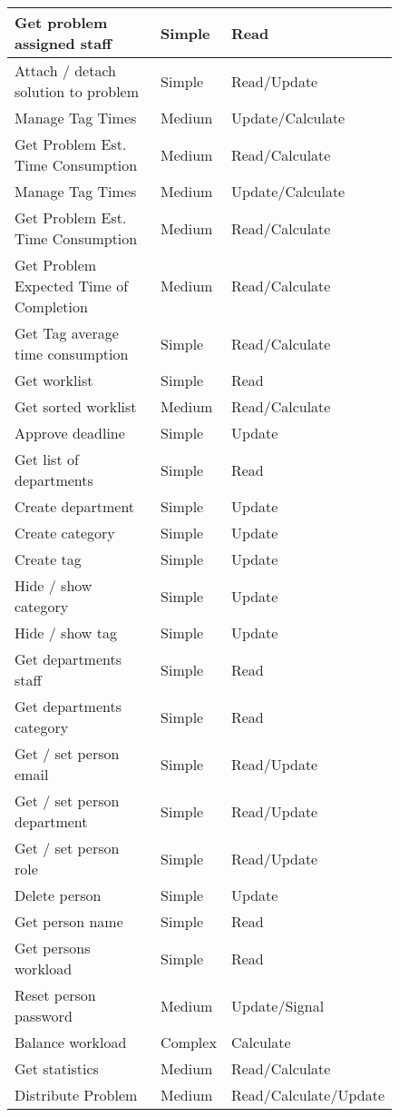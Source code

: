 \begin{figure}[hpt]
\begin{center}
\begin{tabular}{|l|l|l|}
Get problem assigned staff 	&   Simple & Read   \\ \hline%
Attach / detach solution to problem	&   Simple & Read/Update   \\ \hline%
Manage Tag Times &   Medium & Update/Calculate \\ \hline
Get Problem Est. Time Consumption 		&   Medium & Read/Calculate   \\ \hline%
Manage Tag Times &   Medium & Update/Calculate \\ \hline
Get Problem Est. Time Consumption 					&   Medium & Read/Calculate   \\ \hline%
Get Problem Expected Time of Completion 					&   Medium & Read/Calculate   \\ \hline%
Get Tag average time consumption					&   Simple & Read/Calculate   \\ \hline%
Get worklist 								&   Simple & Read   \\ \hline%
Get sorted worklist 								&   Medium & Read/Calculate   \\ \hline%
Approve deadline 						&   Simple & Update   \\ \hline%
Get list of departments 		&   Simple & Read   \\ \hline%
Create department 					&   Simple & Update   \\ \hline%
Create category 						&   Simple & Update   \\ \hline%
Create tag									&   Simple & Update   \\ \hline%
Hide / show category				&   Simple & Update   \\ \hline%
Hide / show tag							&   Simple & Update   \\ \hline%
Get departments staff 			&   Simple & Read   \\ \hline%
Get departments category 		&   Simple & Read   \\ \hline%
Get / set person email 			&   Simple & Read/Update   \\ \hline%
Get / set person department &   Simple & Read/Update   \\ \hline%
Get / set person role 			&   Simple & Read/Update   \\ \hline%
Delete person 							&   Simple & Update   \\ \hline%
Get person name 						&   Simple & Read   \\ \hline%
Get persons workload 				&   Simple & Read   \\ \hline%
Reset person password 			&   Medium & Update/Signal   \\ \hline%
Balance workload 						&   Complex & Calculate   \\ \hline%
Get statistics							&   Medium & Read/Calculate   \\ \hline%
Distribute Problem & Medium & Read/Calculate/Update \\ \hline%
\end{tabular}
\end{center}
\label{tab:functionlist}
\end{figure}


